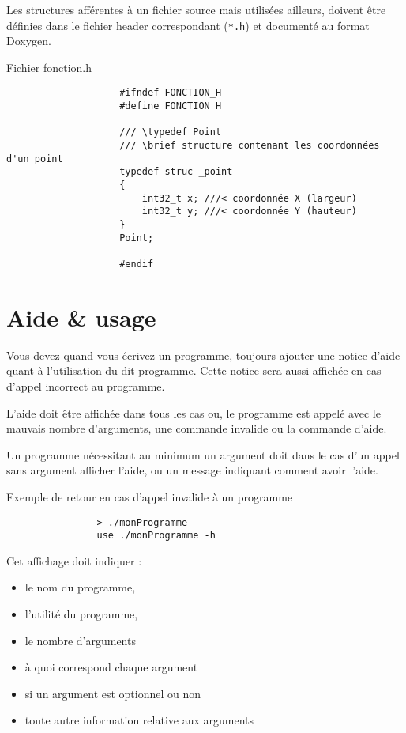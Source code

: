 			Les structures afférentes à un fichier source mais utilisées ailleurs, doivent être définies dans le fichier header correspondant (\verb+*.h+) et documenté au format Doxygen.

			\begin{cbox}{Fichier fonction.h}
				\begin{verbatim}
					#ifndef FONCTION_H
					#define FONCTION_H

					/// \typedef Point
					/// \brief structure contenant les coordonnées d'un point
					typedef struc _point
					{
					    int32_t x; ///< coordonnée X (largeur)
					    int32_t y; ///< coordonnée Y (hauteur)
					}
					Point;

					#endif
				\end{verbatim}
			\end{cbox}

	\section{Aide \& usage}
		Vous devez quand vous écrivez un programme, toujours ajouter une notice d'aide quant à l'utilisation du dit programme. Cette notice sera aussi affichée en cas d'appel incorrect au programme.

		L'aide doit être affichée dans tous les cas ou, le programme est appelé avec le mauvais nombre d'arguments, une commande invalide ou la commande d'aide.

		Un programme nécessitant au minimum un argument doit dans le cas d'un appel sans argument afficher l'aide, ou un message indiquant comment avoir l'aide.

		\begin{cbox}{Exemple de retour en cas d'appel invalide à un programme}
			\begin{verbatim}
				> ./monProgramme
				use ./monProgramme -h
			\end{verbatim}
		\end{cbox}

		Cet affichage doit indiquer : 
		\begin{itemize}
			\item le nom du programme,
			\item l'utilité du programme,
			\item le nombre d'arguments
			\item à quoi correspond chaque argument
			\item si un argument est optionnel ou non
			\item toute autre information relative aux arguments
		\end{itemize}

